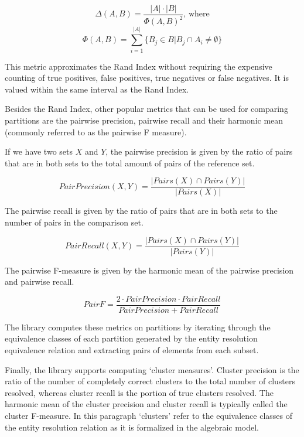 \documentclass[a4paper,twoside]{article}
\begin{document}
    \[ \varDelta(A, B) = \frac{|A|\cdot|B|}{\varPhi{\left(A, B\right)}^2}\textrm{, where}\]
    \[ \varPhi(A, B) = \sum_{i=1}^{|A|}\{B_j \in B | B_j \cap A_i \neq \emptyset \} \]

    This metric approximates the Rand Index without requiring the expensive
    counting of true positives, false positives, true negatives or false
    negatives\cite{tal2007algebraic}.
    It is valued within the same interval as the Rand Index.
    
    Besides the Rand Index, other popular metrics that can be used for comparing
    partitions are the pairwise precision, pairwise recall and their harmonic
    mean (commonly referred to as the pairwise F measure)\cite{hitesh2012}.
    
    If we have two sets $X$ and $Y$, the pairwise precision is given by the
    ratio of pairs that are in both sets to the total amount of pairs of the
    reference set.

    \[ Pair Precision(X, Y) = \frac{|{Pairs(X)}\cap{Pairs(Y)}|}{|Pairs(X)|} \]
    
    The pairwise recall is given by the ratio of pairs that are in both sets
    to the number of pairs in the comparison set\cite{hitesh2012}.

    \[ Pair Recall(X, Y) = \frac{|{Pairs(X)}\cap{Pairs(Y)}|}{|Pairs(Y)|} \]

    The pairwise F-measure is given by the harmonic mean of the pairwise
    precision and pairwise recall.

    \[ Pair F = \frac{2 \cdot Pair Precision \cdot Pair Recall}{Pair Precision + Pair Recall} \]

    The library computes these metrics on partitions by iterating through the
    equivalence classes of each partition generated by the entity resolution
    equivalence relation and extracting pairs of elements from each subset.
    
    Finally, the library supports computing `cluster measures'\cite{hitesh2012}.
    Cluster precision is the ratio of the number of completely correct
    clusters to the total number of clusters resolved, whereas cluster recall
    is the portion of true clusters resolved\cite{huang2006efficient}.
    The harmonic mean of the cluster precision and cluster recall is typically
    called the cluster F-measure.
    In this paragraph `clusters' refer to the equivalence classes of the entity
    resolution relation as it is formalized in the algebraic model.
    
\end{document}
